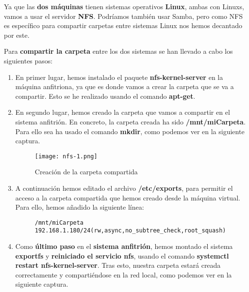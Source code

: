 Ya que las \textbf{dos máquinas} tienen sistemas operativos \textbf{Linux}, ambas con Linuxs, vamos a usar el servidor \textbf{NFS}. Podríamos también usar Samba, pero como NFS es específico para compartir carpetas entre sistemas Linux nos hemos decantado por este.

Para \textbf{compartir la carpeta} entre los dos sistemas se han llevado a cabo los siguientes pasos:

\begin{enumerate}
    \item En primer lugar, hemos instalado el paquete \textbf{nfs-kernel-server} en la máquina anfitriona, ya que es donde vamos a crear la carpeta que se va a compartir. Esto se he realizado usando el comando \textbf{apt-get}.

    \item En segundo lugar, hemos creado la carpeta que vamos a compartir en el sistema anfitrión. En concreto, la carpeta creada ha sido \textbf{/mnt/miCarpeta}. Para ello sea ha usado el comando \textbf{mkdir}, como podemos ver en la siguiente captura.

    \begin{figure}[H]
        \centering
        \texttt{[image: nfs-1.png]}
        \caption{Creación de la carpeta compartida}
    \end{figure}

    \item A continuación hemos editado el archivo \textbf{/etc/exports}, para permitir el acceso a la carpeta compartida que hemos creado desde la máquina virtual. Para ello, hemos añadido la siguiente línea:
    \begin{figure}[H]
        \begin{tcolorbox}[sharp corners, colback=yellow!30, colframe=white!20]
            \scriptsize
            \begin{verbatim}
/mnt/miCarpeta 192.168.1.180/24(rw,async,no_subtree_check,root_squash)\end{verbatim}
        \end{tcolorbox}
    \end{figure}

    \item Como \textbf{último paso} en el \textbf{sistema anfitrión}, hemos montado el sistema \textbf{exportfs} y \textbf{reiniciado el servicio nfs}, usando el comando \textbf{systemctl restart nfs-kernel-server}. Tras esto, nuestra carpeta estará creada correctamente y compartiéndose en la red local, como podemos ver en la siguiente captura.


\end{enumerate}
